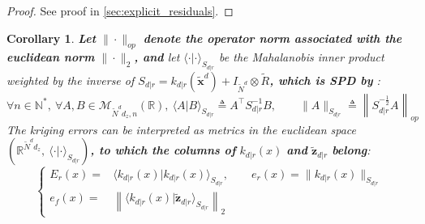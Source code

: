 \documentclass[preprint]{elsarticle}
\newtheorem{corollary}{Corollary}[proposition]
\begin{document}
\begin{proof}
    See proof in \cref{sec:explicit_residuals}.
\end{proof}

\begin{corollary}
    \textbf{Let} $\|\cdot\|_{op}$ \textbf{denote the operator norm associated with the euclidean norm} $\|\cdot\|_2$\textbf{, and} let $\langle\cdot|\cdot\rangle_{S_{d|r}}$ be the Mahalanobis inner product weighted by the inverse of $S_{d|r}=k_{d|r}(\tilde{\mathbf{x}}^d)+I_{\tilde{N}^d}\otimes\tilde{R}$\textbf{, which is SPD by }:
    \begin{equation*}
        \forall n\in\mathbb{N}^*,\:\forall A,B\in\mathcal{M}_{\tilde{N}^dd_z,n}(\mathbb{R}),\:\langle A|B\rangle_{S_{d|r}}\triangleq A^\top S_{d|r}^{-1}B,\qquad\|A\|_{S_{d|r}}\triangleq\left\|S_{d|r}^{-\frac{1}{2}}A\right\|_{op}
    \end{equation*}
    The kriging errors can be interpreted as metrics in the euclidean space $(\mathbb{R}^{\tilde{N}^dd_z},\:\langle\cdot|\cdot\rangle_{S_{d|r}})$\textbf{, to which the columns of} $k_{d|r}(x)$ \textbf{and} $\tilde{\mathbf{z}}_{d|r}$ \textbf{belong}:
    \begin{equation*}
        \left\{\begin{aligned}
        E_r(x)=&\langle k_{d|r}(x)|k_{d|r}(x)\rangle_{S_{d|r}},\qquad e_r(x)=\|k_{d|r}(x)\|_{S_{d|r}}\\
        e_f(x)=&\left\|\langle k_{d|r}(x)|\tilde{\mathbf{z}}_{d|r}\rangle_{S_{d|r}}\right\|_2
        \end{aligned}\right.
    \end{equation*}\label{th:errors_euclidean}
    \vspace{-\baselineskip}
\end{corollary}
\end{document}
